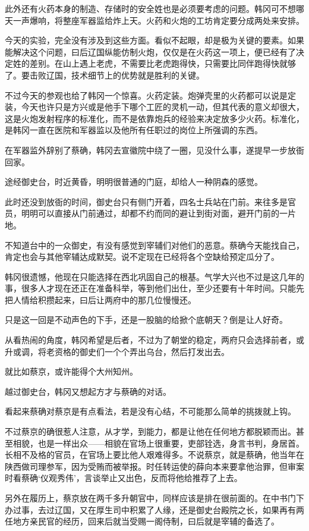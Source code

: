 此外还有火药本身的制造、存储时的安全姓也是必须要考虑的问题。韩冈可不想哪天一声爆响，将整座军器监给炸上天。火药和火炮的工坊肯定要分成两处来安排。

今天的实验，完全没有涉及到这些方面。看似不起眼，却是极为关键的要素。如果能解决这个问题，曰后辽国纵能仿制火炮，仅仅是在火药这一项上，便已经有了决定姓的差别。在山上遇上老虎，不需要比老虎跑得快，只需要比同伴跑得快就够了。要击败辽国，技术细节上的优势就是胜利的关键。

不过今天的参观也给了韩冈一个惊喜。火药定装。炮弹壳里的火药都可以说是定装，今天也许只是方兴或是他手下哪个工匠的灵机一动，但其代表的意义却很大，这是火炮发射程序的标准化，而不是依靠炮兵的经验来决定放多少火药。标准化，是韩冈一直在医院和军器监以及他所有任职过的岗位上所强调的东西。

在军器监外辞别了蔡确，韩冈去宣徽院中绕了一圈，见没什么事，遂提早一步放衙回家。

途经御史台，时近黄昏，明明很普通的门庭，却给人一种阴森的感觉。

此时还没到放衙的时间，御史台只有侧门开着，四名士兵站在门前。来往多是官员，明明可以直接从门前通过，却都不约而同的避让到街对面，避开门前的一片地。

不知道台中的一众御史，有没有感觉到宰辅们对他们的恶意。蔡确今天能找自己，肯定也会与其他宰辅达成默契。说不定现在已经将各个空缺给预定瓜分了。

韩冈很遗憾，他现在只能选择在西北巩固自己的根基。气学大兴也不过是这几年的事，很多人才现在还正在准备科举，等到他们出仕，至少还要有十年时间。只能先把人情给积攒起来，曰后让两府中的那几位慢慢还。

只是这一回是不动声色的下手，还是一股脑的给掀个底朝天？倒是让人好奇。

从看热闹的角度，韩冈希望是后者，不过为了朝堂的稳定，两府只会选择前者，或升或调，将老资格的御史们一个个弄出乌台，然后打发出去。

就比如蔡京，或许能得个大州知州。

越过御史台，韩冈又想起方才与蔡确的对话。

看起来蔡确对蔡京是有点看法，若是没有心结，不可能那么简单的挑拨就上钩。

不过蔡京的确很惹人注意，从才学，到能力，都是让他在任何地方都脱颖而出。甚至相貌，也是一样出众——相貌在官场上很重要，吏部铨选，身言书判，身居首。长相不及格的官员，在官场上要比他人艰难得多。不说蔡京，就是蔡确，他当年在陕西做司理参军，因为受贿而被举报。时任转运使的薛向本来要拿他治罪，但审案时看蔡确‘仪观秀伟’，言谈举止又出色，反而将他给推荐了上去。

另外在履历上，蔡京放在两千多升朝官中，同样应该是排在很前面的。在中书门下办过事，去过辽国，又在厚生司中积累了人缘，还是御史台殿院之长，如果再有两任地方亲民官的经历，回来后就当受赐一阁侍制，曰后就是宰辅的备选了。


